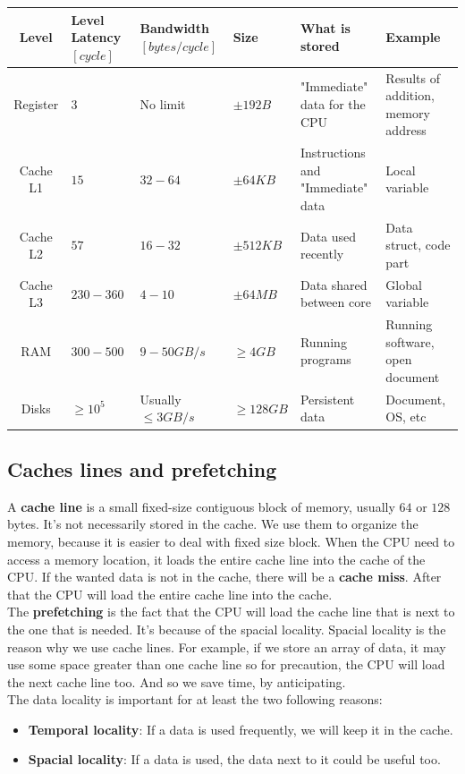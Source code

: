 \documentclass[12pt, openany]{report}
\theoremstyle{definition}
\begin{document}
\begin{tabularx}{\textwidth}{|c|X|X|X|X|X|}
	\hline
	Level & Level \newline Latency $[cycle]$  & Bandwidth $[bytes/cycle]$ & Size & What \newline is stored & Example \\
	\hline
	Register & $3$ & No limit & $\pm 192B$ & "Immediate" data for the CPU & Results of addition, memory address\\
	\hline
	Cache L1 & $15$ & $32-64$ & $\pm 64KB$ & Instructions and \newline "Immediate" data & Local \newline variable\\
	\hline
	Cache L2 & $57$ & $16-32$ & $\pm 512KB$ & Data used recently & Data struct, code part\\
	\hline
	Cache L3 & $230-360$ & $4-10$ & $\pm 64MB$ & Data shared between core& Global \newline variable\\
	\hline
	RAM & $300-500$ & $9-50GB/s$ & $\geq 4GB$ & Running programs & Running software, open \newline document\\
	\hline
	Disks & $\geq 10^5$ & Usually $\leq 3GB/s$ & $\geq 128GB$ & Persistent data & Document, OS, etc\\
	\hline
\end{tabularx}
\subsection{Caches lines and prefetching}\label{caches_lines}
A \textbf{cache line} is a small fixed-size contiguous block of memory, usually $64$ or $128$ bytes. It's not necessarily stored in the cache. We use them to organize the memory, because it is easier to deal with fixed size block. When the CPU need to access a memory location, it loads the entire cache line into the cache of the CPU.
If the wanted data is not in the cache, there will be a \textbf{cache miss}. After that the CPU will load the entire cache line into the cache.\\
The \textbf{prefetching} is the fact that the CPU will load the cache line that is next to the one that is needed. It's because of the spacial locality. Spacial locality is the reason why we use cache lines. For example, if we store an array of data, it may use some space greater than one cache line so for precaution, the CPU will load the next cache line too. And so we save time, by anticipating.\\
The data locality is important for at least the two following reasons:
\begin{itemize}
	\item \textbf{Temporal locality}: If a data is used frequently, we will keep it in the cache.
	\item \textbf{Spacial locality}: If a data is used, the data next to it could be useful too.
\end{itemize}
\newpage
\end{document}
